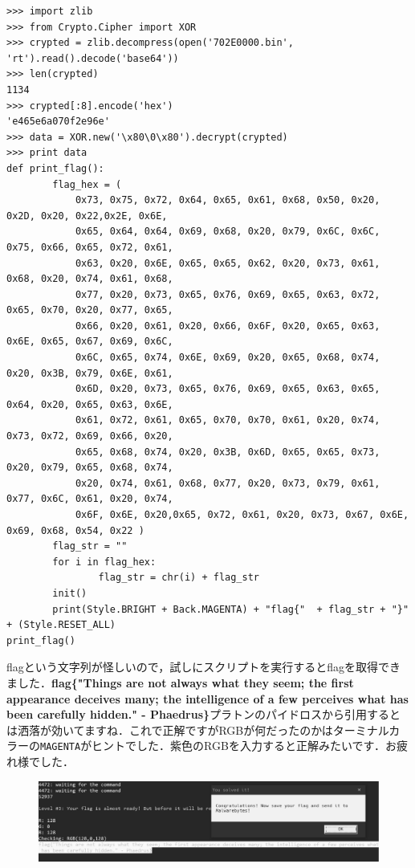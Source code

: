 \begin{tcolorbox}[title=XORを使ったデコード, sharp corners, left=2mm]\scriptsize
\begin{verbatim}
>>> import zlib
>>> from Crypto.Cipher import XOR
>>> crypted = zlib.decompress(open('702E0000.bin', 'rt').read().decode('base64'))
>>> len(crypted)
1134
>>> crypted[:8].encode('hex')
'e465e6a070f2e96e'
>>> data = XOR.new('\x80\0\x80').decrypt(crypted)
>>> print data
def print_flag():
        flag_hex = ( 
            0x73, 0x75, 0x72, 0x64, 0x65, 0x61, 0x68, 0x50, 0x20, 0x2D, 0x20, 0x22,0x2E, 0x6E, 
            0x65, 0x64, 0x64, 0x69, 0x68, 0x20, 0x79, 0x6C, 0x6C, 0x75, 0x66, 0x65, 0x72, 0x61, 
            0x63, 0x20, 0x6E, 0x65, 0x65, 0x62, 0x20, 0x73, 0x61, 0x68, 0x20, 0x74, 0x61, 0x68, 
            0x77, 0x20, 0x73, 0x65, 0x76, 0x69, 0x65, 0x63, 0x72, 0x65, 0x70, 0x20, 0x77, 0x65, 
            0x66, 0x20, 0x61, 0x20, 0x66, 0x6F, 0x20, 0x65, 0x63, 0x6E, 0x65, 0x67, 0x69, 0x6C, 
            0x6C, 0x65, 0x74, 0x6E, 0x69, 0x20, 0x65, 0x68, 0x74, 0x20, 0x3B, 0x79, 0x6E, 0x61, 
            0x6D, 0x20, 0x73, 0x65, 0x76, 0x69, 0x65, 0x63, 0x65, 0x64, 0x20, 0x65, 0x63, 0x6E, 
            0x61, 0x72, 0x61, 0x65, 0x70, 0x70, 0x61, 0x20, 0x74, 0x73, 0x72, 0x69, 0x66, 0x20, 
            0x65, 0x68, 0x74, 0x20, 0x3B, 0x6D, 0x65, 0x65, 0x73, 0x20, 0x79, 0x65, 0x68, 0x74, 
            0x20, 0x74, 0x61, 0x68, 0x77, 0x20, 0x73, 0x79, 0x61, 0x77, 0x6C, 0x61, 0x20, 0x74, 
            0x6F, 0x6E, 0x20,0x65, 0x72, 0x61, 0x20, 0x73, 0x67, 0x6E, 0x69, 0x68, 0x54, 0x22 )
        flag_str = ""
        for i in flag_hex:
                flag_str = chr(i) + flag_str
        init()
        print(Style.BRIGHT + Back.MAGENTA) + "flag{"  + flag_str + "}" + (Style.RESET_ALL)
print_flag()
\end{verbatim}
\end{tcolorbox}
flagという文字列が怪しいので，試しにスクリプトを実行するとflagを取得できました\faFlag．\textbf{flag\{"Things are not always what they seem; the first appearance deceives many; the intelligence of a few perceives what has been carefully hidden." - Phaedrus\}}プラトンのパイドロスから引用するとは洒落が効いてますね．これで正解ですがRGBが何だったのかはターミナルカラーの\texttt{MAGENTA}がヒントでした．紫色のRGBを入力すると正解みたいです．お疲れ様でした．
\begin{figure}[H]
    \centering
    \includegraphics[width=\linewidth]{./assets/takuzoo3868asset/crack_level3_gray.png}
    \label{fig:crack_level3}
\end{figure}

